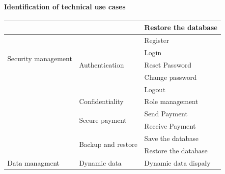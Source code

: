 \paragraph{Identification of technical use cases}

\begin{longtable}{|m{10em}|m{10em}|m{10em}|}\hline
      &                                          & Restore the database                                       \\\hline

      \multirow{4}{*}{Security management} & \multirow{5}{*}{Authentication}          & Register                                                    \\\cline{3-3}
                                           &                                          & Login                                                       \\\cline{3-3}
                                           &                                          & Reset Password                                              \\\cline{3-3}
                                           &                                          & Change password                                             \\\cline{3-3}
                                           &                                          & Logout                                                      \\\cline{2-3}
                                           & \multirow{1}{*}{Confidentiality}         & Role management                                             \\\cline{2-3}
                                           & \multirow{2}{*}{Secure payment}          & Send Payment                                                \\\cline{3-3}
                                           &                                          & Receive Payment                                             \\\cline{2-3}
                                           & \multirow{2}{*}{Backup and restore}      & Save the database                                           \\\cline{3-3}
                                           &                                          & Restore the database                                       \\\hline
      \multirow{7}{*}{Data managment}      & \multirow{1}{*}{Dynamic data}            & Dynamic data dispaly                                       \\\cline{2-3}

\end{longtable}
